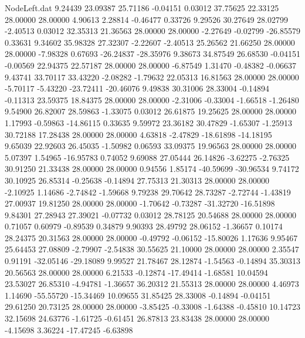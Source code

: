 \begin{filecontents}{NodeLeft.dat}
   9.24439   23.09387   25.71186    -0.04151    0.03012   37.75625   22.33125   28.00000   28.00000    4.90613    2.28814   -0.46477    0.33726
   9.29526   30.27649   28.02799    -2.40513    0.03012   32.35313   21.36563   28.00000   28.00000   -2.27649   -0.02799  -26.85579    0.33631
   9.34602   35.98328   27.32307    -2.22607   -2.40513   25.26562   21.66250   28.00000   28.00000   -7.98328    0.67693  -26.24837  -28.35976
   9.38673   34.87549   26.68530    -0.04151   -0.00569   22.94375   22.57187   28.00000   28.00000   -6.87549    1.31470   -0.48382   -0.06637
   9.43741   33.70117   33.43220    -2.08282   -1.79632   22.05313   16.81563   28.00000   28.00000   -5.70117   -5.43220  -23.72411  -20.46076
   9.49838   30.31006   28.33004    -0.14894   -0.11313   23.59375   18.84375   28.00000   28.00000   -2.31006   -0.33004   -1.66518   -1.26480
   9.54900   26.82007   28.59863    -1.33075    0.03012   26.61875   19.25625   28.00000   28.00000    1.17993   -0.59863  -14.86115    0.33635
   9.59972   23.36182   30.47829    -1.65307   -1.25913   30.72188   17.28438   28.00000   28.00000    4.63818   -2.47829  -18.61898  -14.18195
   9.65039   22.92603   26.45035    -1.50982    0.06593   33.09375   19.96563   28.00000   28.00000    5.07397    1.54965  -16.95783    0.74052
   9.69088   27.05444   26.14826    -3.62275   -2.76325   30.91250   21.33438   28.00000   28.00000    0.94556    1.85174  -40.59699  -30.96534
   9.74172   30.10925   26.85314    -0.25638   -0.14894   27.75313   21.30313   28.00000   28.00000   -2.10925    1.14686   -2.74842   -1.59668
   9.79238   29.70642   28.73287    -2.72744   -1.43819   27.00937   19.81250   28.00000   28.00000   -1.70642   -0.73287  -31.32720  -16.51898
   9.84301   27.28943   27.39021    -0.07732    0.03012   28.78125   20.54688   28.00000   28.00000    0.71057    0.60979   -0.89539    0.34879
   9.90393   28.49792   28.06152    -1.36657    0.10174   28.24375   20.31563   28.00000   28.00000   -0.49792   -0.06152  -15.80026    1.17636
   9.95467   25.64453   27.08809    -2.79907   -2.54838   30.55625   21.10000   28.00000   28.00000    2.35547    0.91191  -32.05146  -29.18089
   9.99527   21.78467   28.12874    -1.54563   -0.14894   35.30313   20.56563   28.00000   28.00000    6.21533   -0.12874  -17.49414   -1.68581
  10.04594   23.53027   26.85310    -4.94781   -1.36657   36.20312   21.55313   28.00000   28.00000    4.46973    1.14690  -55.55720  -15.34469
  10.09655   31.85425   28.33008    -0.14894   -0.04151   29.61250   20.73125   28.00000   28.00000   -3.85425   -0.33008   -1.64388   -0.45810
  10.14723   32.15698   24.63776    -1.61725   -0.61451   26.87813   23.83438   28.00000   28.00000   -4.15698    3.36224  -17.47245   -6.63898

\end{filecontents}
